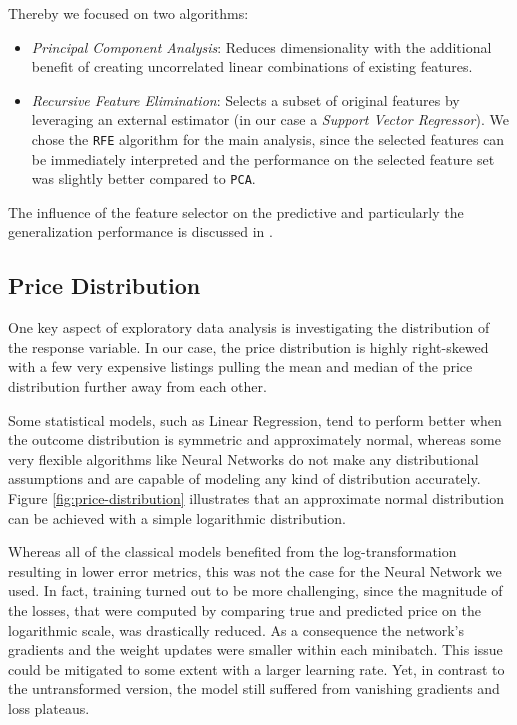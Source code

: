 Thereby we focused on two algorithms:
\begin{itemize}
  \item \emph{Principal Component Analysis}:
        Reduces dimensionality with the additional benefit of creating uncorrelated linear combinations of existing features.
  \item \emph{Recursive Feature Elimination}:
        Selects a subset of original features by leveraging an external estimator (in our case a \emph{Support Vector Regressor}).
        We chose the \texttt{RFE} algorithm for the main analysis, since the selected features can be immediately interpreted and the performance on the selected feature set was slightly better compared to \texttt{PCA}.

\end{itemize}

The influence of the feature selector on the predictive and particularly the generalization performance is discussed in .

\subsection{Price Distribution} \label{appendix:price-distribution}

One key aspect of exploratory data analysis is investigating the distribution of the response variable.
In our case, the price distribution is highly right-skewed with a few very expensive listings pulling the mean and median of the price distribution further away from each other.

Some statistical models, such as Linear Regression, tend to perform better when the outcome distribution is symmetric and approximately normal, whereas some very flexible algorithms like Neural Networks do not make any distributional assumptions and are capable of modeling any kind of distribution accurately.
Figure \ref{fig:price-distribution} illustrates that an approximate normal distribution can be achieved with a simple logarithmic distribution.

Whereas all of the classical models benefited from the log-transformation resulting in lower error metrics, this was not the case for the Neural Network we used.
In fact, training turned out to be more challenging, since the magnitude of the losses, that were computed by comparing true and predicted price on the logarithmic scale, was drastically reduced.
As a consequence the network's gradients and the weight updates were smaller within each minibatch.
This issue could be mitigated to some extent with a larger learning rate.
Yet, in contrast to the untransformed version, the model still suffered from vanishing gradients and loss plateaus.

